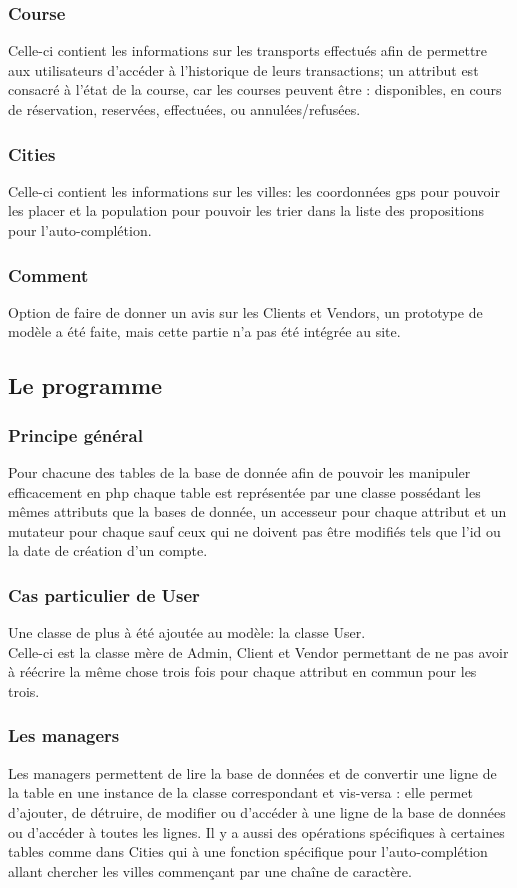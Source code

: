 \documentclass{article}
\begin{document}
		\subsubsection{Course}
			Celle-ci contient les informations sur les transports effectués afin de permettre aux utilisateurs d'accéder à l'historique de leurs transactions; un attribut est consacré à l'état de la course, car les courses peuvent être : disponibles, en cours de réservation, reservées, effectuées, ou annulées/refusées.
		\subsubsection{Cities}
			Celle-ci contient les informations sur les villes: les coordonnées gps pour pouvoir les placer et la population pour pouvoir les trier dans la liste des propositions pour l’auto-complétion.
		\subsubsection{Comment}
		    Option de faire de donner un avis sur les Clients et Vendors, un prototype de modèle a été faite, mais cette partie n'a pas été intégrée au site.
	\subsection{Le programme}
		\subsubsection{Principe général}
			Pour chacune des tables de la base de donnée afin de pouvoir les manipuler efficacement en php chaque table est représentée par une classe possédant les mêmes attributs que la bases de donnée, un accesseur pour chaque attribut et un mutateur pour chaque sauf ceux qui ne doivent pas être modifiés tels que l'id ou la date de création d'un compte.
		\subsubsection{Cas particulier de User}
			Une classe de plus à été ajoutée au modèle: la classe User.\\ Celle-ci est la classe mère de Admin, Client et Vendor permettant de ne pas avoir à réécrire la même chose trois fois pour chaque attribut en commun pour les trois.
		\subsubsection{Les managers}
			Les managers permettent de lire la base de données et de convertir une ligne de la table en une instance de la classe correspondant et vis-versa : elle permet d'ajouter, de détruire, de modifier ou d'accéder à une ligne de la base de données ou d'accéder à toutes les lignes. Il y a aussi des opérations spécifiques à certaines tables comme dans Cities qui à une fonction spécifique pour l'auto-complétion allant chercher les villes commençant par une chaîne de caractère.
\end{document}
